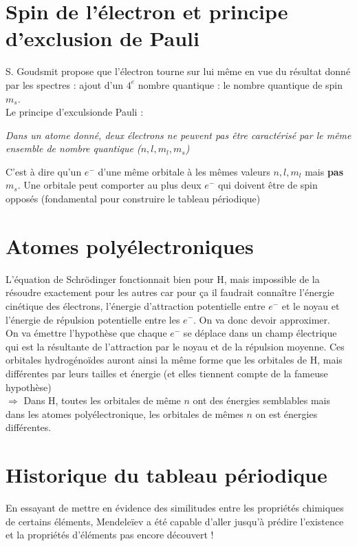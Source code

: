 \documentclass[british,french,11pt, a4paper, openany]{book}
\begin{document}
\section{Spin de l'électron et principe d'exclusion de Pauli}
S. Goudsmit propose que l'électron tourne sur lui même en vue du résultat donné par les spectres : ajout d'un $4^e$ nombre quantique : le nombre quantique de spin $m_s$.\\
Le principe d'exculsionde Pauli : 
\begin{center}
	\textit{Dans un atome donné, deux électrons ne peuvent pas être caractérisé par le même ensemble de nombre quantique ($n, l, m_l, m_s$)}
\end{center}
C'est à dire qu'un $e^-$ d'une même orbitale à les mêmes valeurs $n, l, m_l$ mais \textbf{pas} $m_s$. Une orbitale peut comporter au plus deux $e^-$ qui doivent être de spin opposés (fondamental pour construire le tableau périodique)

\section{Atomes polyélectroniques}
L'équation de Schrödinger fonctionnait bien pour H, mais impossible de la résoudre exactement pour les autres car pour ça il faudrait connaître l'énergie cinétique des électrons, l'énergie d'attraction potentielle entre $e^-$ et le noyau et l'énergie de répulsion potentielle entre les $e^-$. On va donc devoir approximer.\\

On va émettre l'hypothèse que chaque $e^-$ se déplace dans un champ électrique qui est la résultante de l'attraction par le noyau et de la répulsion moyenne. Ces orbitales hydrogénoïdes auront ainsi la même forme que les orbitales de H, mais différentes par leurs tailles et énergie (et elles tiennent compte de la fameuse hypothèse)\\

$\Rightarrow$ Dans H, toutes les orbitales de même $n$ ont des énergies semblables mais dans les atomes polyélectronique, les orbitales de mêmes $n$ on est énergies différentes.

\section{Historique du tableau périodique}
En essayant de mettre en évidence des similitudes entre les propriétés chimiques de certains éléments, Mendeleïev a été capable d'aller jusqu'à prédire l'existence et la propriétés d'éléments pas encore découvert ! 
\end{document}
